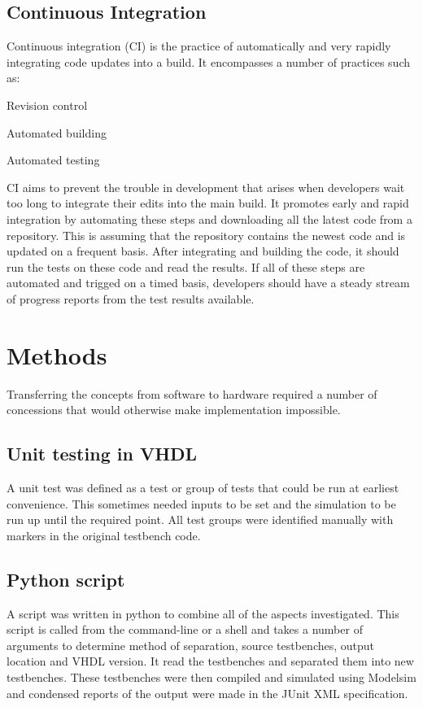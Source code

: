 \documentclass[twoside]{article}
\begin{document}
\begin{multicols}{2}
\subsection{Continuous Integration}
Continuous integration (CI) is the practice of automatically and very rapidly integrating code updates into a build. It encompasses a number of practices such as:
\begin{compactitem}
\item Revision control
\item Automated building
\item Automated testing
\end{compactitem}
CI aims to prevent the trouble in development that arises when developers wait too long to integrate their edits into the main build. It promotes early and rapid integration by automating these steps and downloading all the latest code from a repository. This is assuming that the repository contains the newest code and is updated on a frequent basis. After integrating and building the code, it should run the tests on these code and read the results. If all of these steps are automated and trigged on a timed basis, developers should have a steady stream of progress reports from the test results available.\cite{ci1,ci3}


\section{Methods}
Transferring the concepts from software to hardware required a number of concessions that would otherwise make implementation impossible.

\subsection{Unit testing in VHDL}
A unit test was defined as a test or group of tests that could be run at earliest convenience. This sometimes needed inputs to be set and the simulation to be run up until the required point. All test groups were identified manually with markers in the original testbench code.

\subsection{Python script}
A script was written in python to combine all of the aspects investigated. This script is called from the command-line or a shell and takes a number of arguments to determine method of separation, source testbenches, output location and VHDL version. It read the testbenches and separated them into new testbenches. These testbenches were then compiled and simulated using Modelsim and condensed reports of the output were made in the JUnit XML specification.


\end{multicols}
\end{document}
